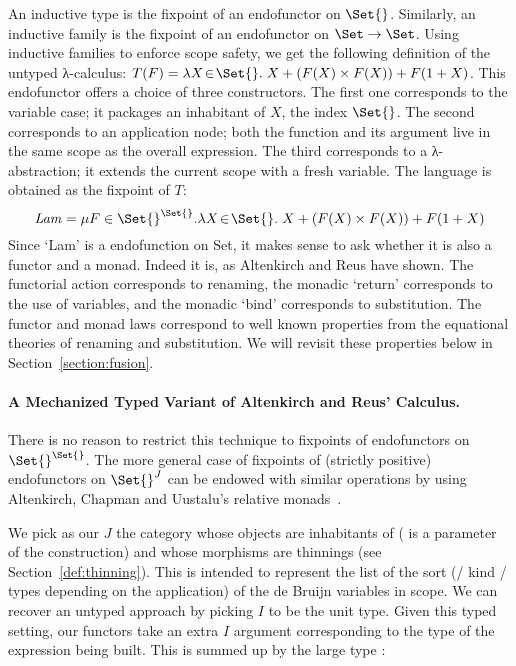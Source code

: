 An inductive type is the fixpoint of an endofunctor on $\Set{}$.
Similarly, an inductive family is the fixpoint of an endofunctor on
$\Set \to \Set$. Using inductive families to enforce scope safety, we
get the following definition of the untyped λ-calculus: $T(F)
= \lambda X \!\in\! \Set{}.\; X + (F(X) \times F(X)) + F(1 + X)$.
This endofunctor offers a choice of three constructors.  The first one
corresponds to the variable case; it packages an inhabitant of $X$,
the index $\Set{}$. The second corresponds to an application node;
both the function and its argument live in the same scope as the
overall expression. The third corresponds to a λ-abstraction;
it extends the current scope with a fresh variable.  The language is
obtained as the fixpoint of $T$:
\[
   \mathit{Lam} = \mu F \in \Set{}^{\Set{}}.
   \lambda X \!\in\! \Set{}.\; X + (F(X) \times F(X)) + F(1 + X)
\]
Since `Lam' is a endofunction on Set, it makes
sense to ask whether it is also a functor and a monad. Indeed it is,
as Altenkirch and Reus have shown. The functorial action corresponds
to renaming, the monadic `return' corresponds to the use of variables,
and the monadic `bind' corresponds to substitution. The functor and
monad laws correspond to well known properties from the equational
theories of renaming and substitution. We will revisit these properties
below in Section~\ref{section:fusion}.

\paragraph{A Mechanized Typed Variant of Altenkirch and Reus' Calculus.}\label{section:mech-reus}

There is no reason to restrict this technique to fixpoints of endofunctors
on $\Set{}^{\Set{}}$. The more general
case of fixpoints of (strictly positive) endofunctors on $\Set{}^J$ can be
endowed with similar operations by using Altenkirch, Chapman and
Uustalu's relative monads~\citeyear{Altenkirch2010, JFR4389}.

We pick as our $J$ the category whose objects are inhabitants of
  ( is a parameter of the construction) and whose morphisms are
thinnings (see Section~\ref{def:thinning}).  This   is
intended to represent the list of the sort (/ kind / types depending
on the application) of the de Bruijn variables in scope. We can
recover an untyped approach by picking $I$ to be the unit type.  Given
this typed setting, our functors take an extra $I$ argument
corresponding to the type of the expression being built. This is
summed up by the large type 
:%

